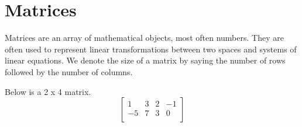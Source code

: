\section{Matrices}
\noindent
Matrices are an array of mathematical objects, most often numbers.
They are often used to represent linear transformations between two spaces and systems of linear equations.
We denote the size of a matrix by saying the number of rows followed by the number of columns.

\begin{example}
	Below is a 2 x 4 matrix.
	\begin{equation*}
		\begin{bmatrix}
			1 & 3 & 2 & -1 \\
			-5 & 7 & 3 & 0 \\
		\end{bmatrix}
	\end{equation*}
\end{example}




